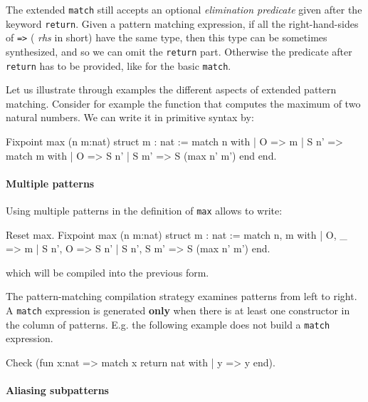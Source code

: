 The extended \texttt{match} still accepts an optional {\em elimination
predicate} given after the keyword \texttt{return}.  Given a pattern
matching expression, if all the right-hand-sides of \texttt{=>} ({\em
rhs} in short) have the same type, then this type can be sometimes
synthesized, and so we can omit the \texttt{return} part. Otherwise 
the predicate after \texttt{return} has to be provided, like for the basic
\texttt{match}.

Let us illustrate through examples the different aspects of extended
pattern matching. Consider for example the function that computes the
maximum of two natural numbers. We can write it in primitive syntax
by:

\begin{coq_example}
Fixpoint max (n m:nat) {struct m} : nat :=
  match n with
  | O => m
  | S n' => match m with
            | O => S n'
            | S m' => S (max n' m')
            end
  end.
\end{coq_example}

\paragraph{Multiple patterns}

Using multiple patterns in the definition of {\tt max} allows to write:

\begin{coq_example}
Reset max.
Fixpoint max (n m:nat) {struct m} : nat :=
  match n, m with
  | O, _ => m
  | S n', O => S n'
  | S n', S m' => S (max n' m')
  end.
\end{coq_example}

which will be compiled into the previous form.

The pattern-matching compilation strategy examines patterns from left
to right. A \texttt{match} expression is generated {\bf only} when
there is at least one constructor in the column of patterns. E.g. the
following example does not build a \texttt{match} expression.

\begin{coq_example}
Check (fun x:nat => match x return nat with
                    | y => y
                    end).
\end{coq_example}

\paragraph{Aliasing subpatterns}

